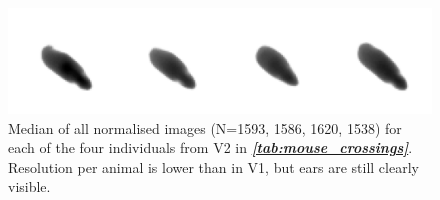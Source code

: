 \documentclass[9pt,lineno]{elife}
\newcommand{\tableref}[1]{\textit{\textbf{\ref{tab:#1}}}\xspace}
\begin{document}
\begin{figure}
\begin{fullwidth}
\includegraphics[width=1.0\linewidth]{figures/mice_camera_image.pdf}
\caption{{\color{blue}Median of all normalised images (N=1593, 1586, 1620, 1538) for each of the four individuals from V2 in \tableref{mouse_crossings}. Resolution per animal is lower than in V1, but ears are still clearly visible.}}
\label{fig:mice_camera_image}
\end{fullwidth}
\end{figure}
\end{document}
